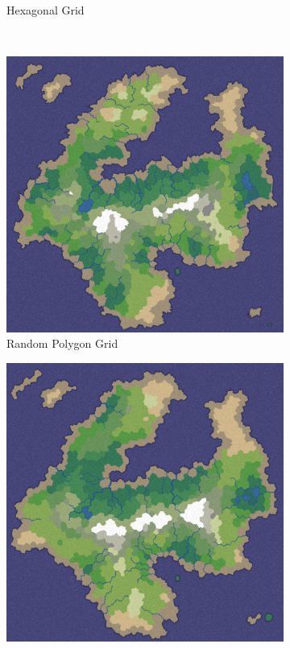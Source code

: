 \begin{figure}
\begin{subfigure}[b]{0.45\textwidth}
                \caption{Hexagonal Grid}
                \label{fig:Hex}
        \end{subfigure}
        ~ %
        \begin{subfigure}[b]{0.45\textwidth}
                \includegraphics[width=\textwidth]{Random.png}
                \caption{Random Polygon Grid}
                \label{fig:Random}
        \end{subfigure}
        \begin{subfigure}[b]{0.45\textwidth}
                \includegraphics[width=\textwidth]{Relaxed.png}

\end{subfigure}
\end{figure}
